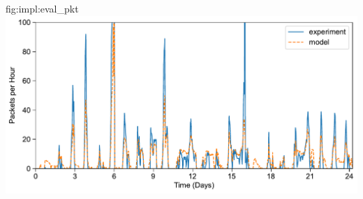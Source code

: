 \begin{definefigure}{fig:impl:eval_pkt}
    \centering
    \includegraphics[width=\columnwidth]{figs/capacity/experiment_pkt/exp_vs_sim_pkt}
    \label{fig:eval:pkt}
    \caption{Performance comparison of model expectation versus real batteryless system. 
    Data from a three month deployment of two systems is used to verify our model.
    We use three weeks of illuminance measurements %
    to estimate irradiance and model the number of packets transmitted by an
    batteryless node. Average daily error is 15\%, with a standard deviation
    of 17\%. 
    } 
\end{definefigure}

